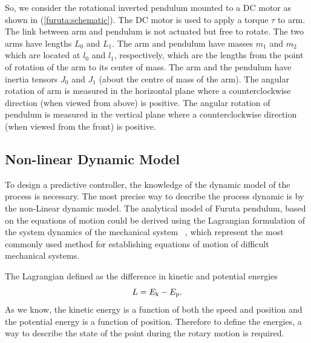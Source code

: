 So, we consider the rotational inverted pendulum mounted to a DC motor as shown in (\ref{furuta:schematic}). The DC motor is used to apply a torque $\tau$ to arm. The link between arm and pendulum is not actuated but free to rotate. The two arms have lengths $L_0$ and $L_1$. The arm and pendulum have masses $m_1$ and $m_2$ which are located at $l_0$ and $l_1$, respectively, which are the lengths from the point of rotation of the arm to its center of mass. The arm and the pendulum have inertia tensors $J_0$ and $J_1$ (about the centre of mass of the arm). The angular rotation of arm is measured in the horizontal plane where a counterclockwise direction (when viewed from above) is positive. The angular rotation of pendulum is measured in the vertical plane where a counterclockwise direction (when viewed from the front) is positive.
\subsection{Non-linear Dynamic Model}
To design a predictive controller, the knowledge of the dynamic model of the process is necessary. The most precise way to describe the process dynamic is by the non-Linear dynamic model. The analytical model of Furuta pendulum, based on the equations of motion could be derived using the Lagrangian formulation of the system dynamics of the mechanical system ~\cite{furuta:model}, which represent the most commonly used method for establishing equations of motion of difficult mechanical systems.

The Lagrangian defined as the difference in kinetic and potential energies
\begin{equation}
L = E _{\text{k}} - E _{\text{p}}.
\end{equation}
As we know, the kinetic energy is a function of both the speed and position and the potential energy is a function of position. Therefore to define the energies, a way to describe the state of the point during the rotary motion is required.
